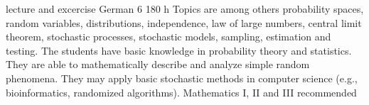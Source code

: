{lecture and excercise}
{German}
{6}
{180 h}
{Topics are among others probability spaces, random variables, distributions, independence, law of large numbers, central limit theorem, stochastic processes, stochastic models, sampling, estimation and testing.}
{The students have basic knowledge in probability theory and statistics. They are able to mathematically describe and analyze simple random phenomena. They may apply basic stochastic methods in computer science (e.g., bioinformatics, randomized algorithms).}
{Mathematics I, II and III recommended}